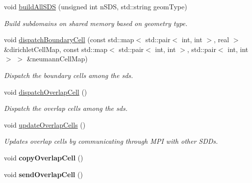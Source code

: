 \begin{DoxyCompactItemize}
void \mbox{\hyperlink{classSDDistributed_a3dbacea02c2d4f36310c81f87f90fe5a}{build\+All\+S\+DS}} (unsigned int n\+S\+DS, std\+::string geom\+Type)
\begin{DoxyCompactList}\small\item\em Build subdomains on shared memory based on geometry type. \end{DoxyCompactList}\item 
\mbox{\label{classSDDistributed_aa7301877492714e144dc056b133d0a54}} 
void \mbox{\hyperlink{classSDDistributed_aa7301877492714e144dc056b133d0a54}{dispatch\+Boundary\+Cell}} (const std\+::map$<$ std\+::pair$<$ int, int $>$, real $>$ \&dirichlet\+Cell\+Map, const std\+::map$<$ std\+::pair$<$ int, int $>$, std\+::pair$<$ int, int $>$ $>$ \&neumann\+Cell\+Map)
\begin{DoxyCompactList}\small\item\em Dispatch the boundary cells among the sds. \end{DoxyCompactList}\item 
\mbox{\label{classSDDistributed_a4cd7f5aea74376a9a40604459bcc9630}} 
void \mbox{\hyperlink{classSDDistributed_a4cd7f5aea74376a9a40604459bcc9630}{dispatch\+Overlap\+Cell}} ()
\begin{DoxyCompactList}\small\item\em Dispatch the overlap cells among the sds. \end{DoxyCompactList}\item 
\mbox{\label{classSDDistributed_afd7366e358e454a2fe2eae2b2c870cf1}} 
void \mbox{\hyperlink{classSDDistributed_afd7366e358e454a2fe2eae2b2c870cf1}{update\+Overlap\+Cells}} ()
\begin{DoxyCompactList}\small\item\em Updates overlap cells by communicating through M\+PI with other S\+D\+Ds. \end{DoxyCompactList}\item 
\mbox{\label{classSDDistributed_a7a3029d43d4961a3ef5c2144e1f28b8f}} 
void {\bfseries copy\+Overlap\+Cell} ()
\item 
\mbox{\label{classSDDistributed_ae58e58e9240e953bc78d94af62d12723}} 
void {\bfseries send\+Overlap\+Cell} ()
\item 

\end{DoxyCompactItemize}
